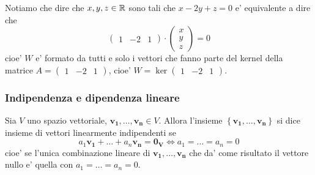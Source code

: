 \begin{example}
    Notiamo che dire che $x, y, z \in \mathbb{R}$ sono tali che $x-2y+z = 0$ e' equivalente a dire che \[
        \begin{pmatrix}
            1 &-2 &1
        \end{pmatrix} \cdot \begin{pmatrix}
            x \\ y \\ z
        \end{pmatrix} = 0
    \]
    cioe' $W$ e' formato da tutti e solo i vettori che fanno parte del kernel della matrice $A = \begin{pmatrix} 1 &-2 &1 \end{pmatrix}$, cioe' $W = \ker \begin{pmatrix} 1 &-2 &1 \end{pmatrix}$.
\end{example}

\subsubsection{Indipendenza e dipendenza lineare}

\begin{definition}
    Sia $V$ uno spazio vettoriale, $\bm{v_1}, \dots, \bm{v_n} \in V$. Allora l'insieme $\left\{ \bm{v_1}, \dots, \bm{v_n} \right\}$ si dice insieme di vettori linearmente indipendenti se
    \begin{equation}
        a_1\bm{v_1} + \dots + a_n\bm{v_n} = \bm{0_V} \iff a_1 = \dots = a_n = 0
    \end{equation}
    cioe' se l'unica combinazione lineare di $\bm{v_1}, \dots, \bm{v_n}$ che da' come risultato il vettore nullo e' quella con $a_1 = \dots = a_n = 0$.
\end{definition}

